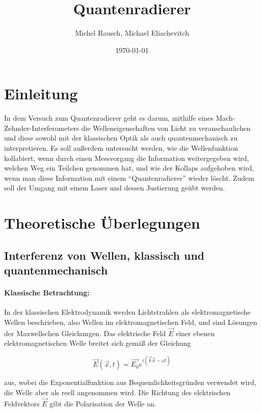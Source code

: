 \documentclass[a4paper,ngerman]{scrartcl}
\title{Quantenradierer}
\date{\today}
\author{Michel Rausch, Michael Eliachevitch}
\begin{document}
\maketitle
\tableofcontents
\thispagestyle{empty} %
\newpage
\setcounter{page}{1}

\section{Einleitung}
\label{sec:einleitung}
In dem Versuch zum Quantenradierer geht es darum, mithilfe eines Mach-Zehnder-Interferometers 
die Welleneigenschaften von Licht zu veranschaulichen und diese sowohl mit der klassischen Optik
als auch quantenmechanisch zu interpretieren. Es soll außerdem untersucht werden, wie die Wellenfunktion
kollabiert, wenn durch einen Messvorgang die Information weitergegeben wird, welchen Weg ein Teilchen genommen hat, und
wie der Kollaps aufgehoben wird, wenn man diese Information mit einem "`Quantenradierer"' wieder löscht.
Zudem soll der Umgang mit einem Laser und dessen Justierung geübt werden.


\section{Theoretische Überlegungen}
\label{sec:theorie}

\subsection{Interferenz von Wellen, klassisch und quantenmechanisch}
\label{sec:interferenz}

\paragraph{Klassische Betrachtung:}
\label{par:klass}
In der klassischen Elektrodynamik werden Lichtstrahlen als elektromagnetische Wellen beschrieben, also Wellen im elektromagnetischen Feld,
und sind Lösungen der Maxwellschen Gleichungen. Das elektrische Feld $\vec{E}$ einer ebenen elektromagnetischen Welle breitet sich gemäß der
Gleichung

\begin{equation}
\vec{E}(\vec{x},t) = \vec{E_0} e^{i(\vec{k}\vec{x}-\omega t)}
\end{equation}

aus, wobei die Exponentialfunktion aus Bequemlichkeitsgründen verwendet wird, die Welle aber
als reell angenommen wird. Die Richtung des elektrischen Feldvektors $\vec{E}$ gibt die Polarisation der Welle an.
\end{document}
